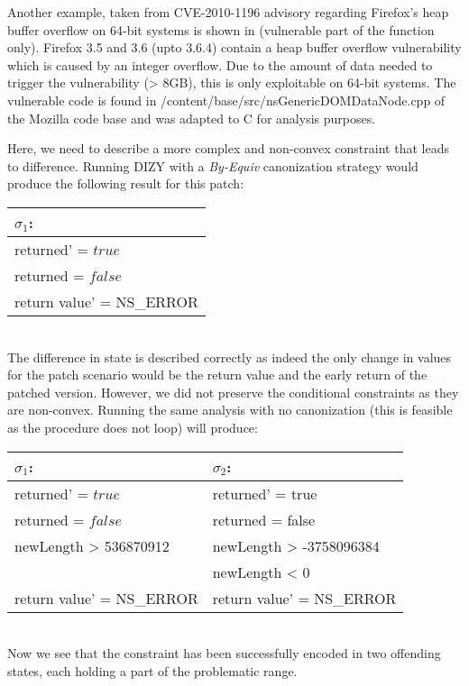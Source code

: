 Another example, taken from CVE-2010-1196 advisory regarding Firefox's heap buffer overflow on 64-bit systems is shown in  (vulnerable part of the function only). Firefox 3.5 and 3.6 (upto 3.6.4) contain a heap buffer overflow vulnerability which is caused by an integer overflow. Due to the amount of data needed to trigger the vulnerability (> 8GB), this is only exploitable on 64-bit systems. The vulnerable code is found in /content/base/src/nsGenericDOMDataNode.cpp
of the Mozilla code base and was adapted to C for analysis purposes.



Here, we need to describe a more complex and non-convex constraint that leads to difference. Running DIZY with a \emph{By-Equiv} canonization strategy would produce the following result for this patch:
\\
\begin{tabular}{l}
$\sigma_1$:                                        
\\ \hline
returned' = $true$                               
\\
returned = $false$                                
\\
return value' = NS\_ERROR                          
\\ \hline
\end{tabular}
\\
The difference in state is described correctly as indeed the only change in values for the patch scenario would be the return value and the early return of the patched version. However, we did not preserve the conditional constraints as they are non-convex. Running the same analysis with no canonization (this is feasible as the procedure does not loop) will produce:
\\
\begin{tabular}{l|l}
$\sigma_1$:                                         & $\sigma_2$:
\\ \hline
returned' = $true$                                  & returned' = true
\\
returned = $false$                                  & returned = false
\\
newLength > 536870912                               & newLength > -3758096384
\\
                                                    & newLength < 0
\\
return value' = NS\_ERROR                           & return value' = NS\_ERROR
\\ \hline
\end{tabular}
\\
Now we see that the  constraint has been successfully encoded in two offending states, each holding a part of the problematic range.

